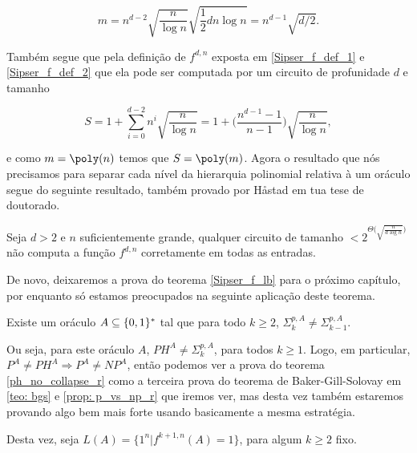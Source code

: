 \begin{equation*}
	m = n^{d - 2}\sqrt{\frac{n}{\log n}}\sqrt{\frac{1}{2}dn\log n} = n^{d - 1}\sqrt{d/2}.
\end{equation*}

Também segue que pela definição de $f^{d, n}$ exposta em \ref{Sipser_f_def_1} e \ref{Sipser_f_def_2} que ela pode ser computada por um circuito de profunidade $d$ e tamanho

\begin{equation*}
	S = 1 + \sum_{i = 0}^{d - 2} n^{i}\sqrt{\frac{n}{\log n}} = 1 + \Big(\frac{n^{d - 1} - 1}{n - 1}\Big)\sqrt{\frac{n}{\log n}},
\end{equation*}

e como $m = \poly(n)$ temos que $S = \poly(m)$. Agora o resultado que nós precisamos para separar cada nível da hierarquia polinomial relativa à um oráculo segue do seguinte resultado, também provado por Håstad em tua tese de doutorado.

\begin{teo} \label{Sipser_f_lb}

Seja $d > 2$ e $n$ suficientemente grande, qualquer circuito de tamanho $< 2^{\Theta\big(\sqrt{\frac{n}{d\log n}}\big)}$ não computa a função $f^{d, n}$ corretamente em todas as entradas.

\end{teo}

De novo, deixaremos a prova do teorema \ref{Sipser_f_lb} para o próximo capítulo, por enquanto só estamos preocupados na seguinte aplicação deste teorema.

\begin{teo} \label{ph_no_collapse_r}
Existe um oráculo $A \subseteq \{0, 1\}^{*}$ tal que para todo $k \geq 2$, $\Sigma_{k}^{p, A} \neq \Sigma_{k - 1}^{p, A}$.
\end{teo}

Ou seja, para este oráculo $A$, $PH^{A} \neq \Sigma_{k}^{p, A}$, para todos $k \geq 1$. Logo, em particular, $P^{A} \neq PH^{A} \Rightarrow P^{A} \neq NP^{A}$, então podemos ver a prova do teorema \ref{ph_no_collapse_r} como a terceira prova do teorema de Baker-Gill-Solovay em \ref{teo: bgs} e \ref{prop: p_vs_np_r} que iremos ver, mas desta vez também estaremos provando algo bem mais forte usando basicamente a mesma estratégia.

Desta vez, seja $L(A) = \{1^{n} \lvert f^{k + 1, n}(A) = 1\}$, para algum $k \geq 2$ fixo.

